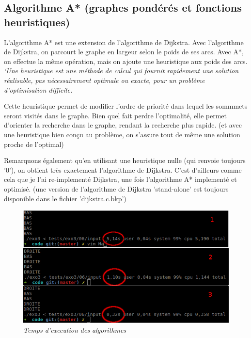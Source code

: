 \documentclass[10pt]{article}
\begin{document}
				
		\subsection{Algorithme A* (graphes pondérés et fonctions heuristiques)}
			L'algorithme A* est une extension de l'algorithme de Dijkstra.\newline
			Avec l'algorithme de Dijkstra, on parcourt le graphe en largeur selon le poids de ses arcs.
			Avec A*, on effectue la même opération, mais on ajoute une heuristique aux poids des arcs.
			\textit{`Une heuristique est une méthode de calcul qui fournit rapidement une solution réalisable,
			pas nécessairement optimale ou exacte, pour un problème d'optimisation difficile.} \cite{heuristique}\newline
			
			Cette heuristique permet de modifier l'ordre de priorité dans lequel les sommmets seront visités dans le graphe.
			Bien quel fait perdre l'optimalité, elle permet d'orienter la recherche dans le graphe, rendant la recherche plus rapide.
			(et avec une heuristique bien conçu au problème, on s'assure tout de même une solution proche de l'optimal)\newline
			
			Remarquons également qu'en utilisant une heuristique nulle (qui renvoie toujours '0'),
			on obtient très exactement l'algorithme de Dijkstra. C'est d'ailleurs comme cela que je l'ai re-implementé
			Dijkstra, une fois l'algorithme A* implementé et optimisé.
			(une version de l'algorithme de Dijkstra 'stand-alone' est toujours disponible dans le fichier 'dijkstra.c.bkp')
	
			\begin{figure}[H]
				\begin{center}
					\includegraphics[width=12cm,height=\textheight,keepaspectratio]{./images/performances.png}
				\end{center}
				\caption{\textit{Temps d'execution des algorithmes}}
			\end{figure}
			
\end{document}
